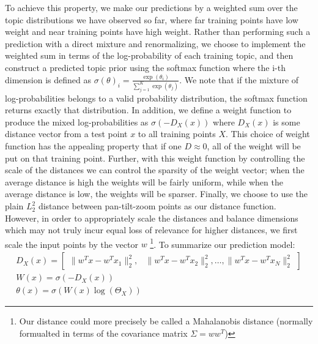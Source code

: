 To achieve this property, we make our predictions by a weighted sum over the topic distributions we have observed so far, where far training points have low weight and near training points have high weight. Rather than performing such a prediction with a direct mixture and renormalizing, we choose to implement the weighted sum in terms of the log-probability of each training topic, and then construct a predicted topic prior using the softmax function where the i-th dimension is defined as $\sigma(\theta)_i = \frac{\exp(\theta_i)}{\sum_{j=1}^{K} \exp(\theta_j)}$. We note that if the mixture of log-probabilities belongs to a valid probability distribution, the softmax function returns exactly that distribution. In addition, we define a weight function to produce the mixed log-probabilities as $\sigma\left(-D_X(x) \right)$ where $D_X(x)$ is some distance vector from a test point $x$ to all training points $X$. This choice of weight function has the appealing property that if one $D \approx 0$, all of the weight will be put on that training point. Further, with this weight function by controlling the scale of the distances we can control the sparsity of the weight vector; when the average distance is high the weights will be fairly uniform, while when the average distance is low, the weights will be sparser. Finally, we choose to use the plain $\mathit{L}_2^2$ distance between pan-tilt-zoom points as our distance function. However, in order to appropriately scale the distances and balance dimensions which may not truly incur equal loss of relevance for higher distances, we first scale the input points by the vector $w$ \footnote{Our distance could more precisely be called a Mahalanobis distance (normally formualted in terms of the covariance matrix $\Sigma = ww^T$)}. To summarize our prediction model:
\begin{equation}
\begin{split}
    D_X(x) = 
    \begin{bmatrix}
    \|w^Tx - w^T x_1 \|_2^2, & \|w^Tx - w^T x_2 \|_2^2, \ldots, \|w^Tx - w^T x_N \|_2^2
    \end{bmatrix}\\
    W(x) = \sigma \left( -D_{X}(x) \right)\\
    \theta(x) = \sigma \left( W(x) \log \left(\Theta_X \right) \right)
\end{split}
\end{equation}

